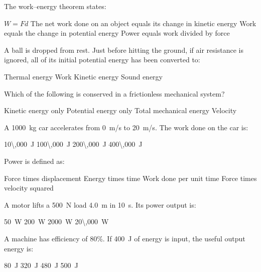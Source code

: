 \documentclass[addpoints]{exam}
\begin{document}
\begin{questions}
\question[1] The work--energy theorem states:
\begin{choices}
    \choice $W = Fd$
    \correctchoice The net work done on an object equals its change in kinetic energy
    \choice Work equals the change in potential energy
    \choice Power equals work divided by force
\end{choices}

\question[1] A ball is dropped from rest. Just before hitting the ground, if air
resistance is ignored, all of its initial potential energy has been converted to:
\begin{choices}
    \choice Thermal energy
    \choice Work
    \correctchoice Kinetic energy
    \choice Sound energy
\end{choices}

\question[1] Which of the following is conserved in a frictionless mechanical system?
\begin{choices}
    \choice Kinetic energy only
    \choice Potential energy only
    \correctchoice Total mechanical energy
    \choice Velocity
\end{choices}

\question[1] A \SI{1000}{kg} car accelerates from \SI{0}{m/s} to \SI{20}{m/s}.
The work done on the car is:
\begin{choices}
    \choice \SI{10\,000}{J}
    \choice \SI{100\,000}{J}
    \correctchoice \SI{200\,000}{J}
    \choice \SI{400\,000}{J}
\end{choices}

\question[1] Power is defined as:
\begin{choices}
    \choice Force times displacement
    \choice Energy times time
    \correctchoice Work done per unit time
    \choice Force times velocity squared
\end{choices}

\question[1] A motor lifts a \SI{500}{N} load \SI{4.0}{m} in \SI{10}{s}. Its power output is:
\begin{choices}
    \choice \SI{50}{W}
    \correctchoice \SI{200}{W}
    \choice \SI{2000}{W}
    \choice \SI{20\,000}{W}
\end{choices}

\question[1] A machine has efficiency of 80\%. If \SI{400}{J} of energy is input, the
useful output energy is:
\begin{choices}
    \choice \SI{80}{J}
    \correctchoice \SI{320}{J}
    \choice \SI{480}{J}
    \choice \SI{500}{J}
\end{choices}


\end{questions}
\end{document}
